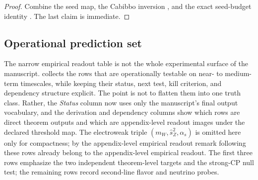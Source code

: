 \begin{proof}
Combine the seed map, the Cabibbo inversion , and the exact
seed-budget identity . The last claim is immediate.
\end{proof}

\subsection{Operational prediction set}

The narrow empirical readout table is not the whole experimental surface of the manuscript.
 collects the rows that are operationally testable on near-
to medium-term timescales, while keeping their status, next test, kill criterion, and dependency
structure explicit. The point is not to flatten them into one truth class. Rather, the
\emph{Status} column now uses only the manuscript's final output vocabulary, and the derivation
and dependency columns show which rows are direct theorem outputs and which are appendix-level
readout images under the declared threshold map. The electroweak triple
$(m_W,\hat s_Z^2,\alpha_s)$ is omitted here only for compactness; by
the appendix-level empirical readout remark following  these rows
already belong to the appendix-level empirical readout. The first three rows emphasize the two
independent theorem-level targets and the strong-CP null test; the remaining rows record
second-line flavor and neutrino probes.

